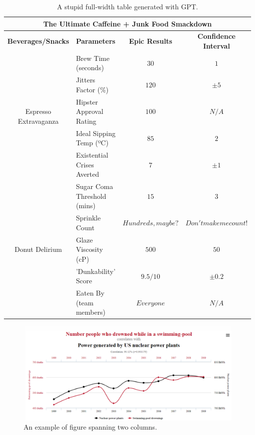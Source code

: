 \begin{table}[h!]
  \centering
  \begin{tabular}{|c|l|c|c|}
    \hline
    \multicolumn{4}{|c|}{\textbf{The Ultimate Caffeine + Junk Food Smackdown}}                                     \\
    \hline
    \textbf{Beverages/Snacks} & \textbf{Parameters}         & \textbf{Epic Results} & \textbf{Confidence Interval} \\
    \hline
    \multirow{5}{*}{Espresso Extravaganza}
                              & Brew Time (seconds)         & \(30\)                & \(1\)                        \\
                              & Jitters Factor (\%)         & \(120\)               & \(±5\)                       \\
                              & Hipster Approval Rating     & \(100\)               & \(N/A\)                      \\
                              & Ideal Sipping Temp (ºC)     & \(85\)                & \(2\)                        \\
                              & Existential Crises Averted  & \(7\)                 & \(±1\)                       \\
    \hline
    \multirow{5}{*}{Donut Delirium}
                              & Sugar Coma Threshold (mins) & \(15\)                & \(3\)                        \\
                              & Sprinkle Count              & \(Hundreds, maybe?\)  & \(Don't make me count!\)     \\
                              & Glaze Viscosity (cP)        & \(500\)               & \(50\)                       \\
                              & 'Dunkability' Score         & \(9.5/10\)            & \(±0.2\)                     \\
                              & Eaten By (team members)     & \(Everyone\)          & \(N/A\)                      \\
    \hline
  \end{tabular}
  \caption{A stupid full-width table generated with GPT.}
\end{table}

\lipsum[1-5]

\lipsum[1-4]

\begin{figure}[h!]
  \centering
  \includegraphics[width=\textwidth]{images/correlation.png}
  \caption{An example of figure spanning two columns.}
  \label{fig:your_label}
\end{figure}


\lipsum[1-4]